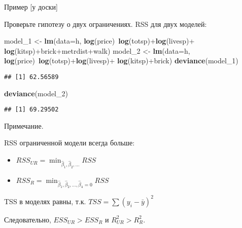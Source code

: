 \documentclass[ignorenonframetext,]{beamer}
\newenvironment{Shaded}{\begin{snugshade}}{\end{snugshade}}
\newcommand{\KeywordTok}[1]{\textcolor[rgb]{0.13,0.29,0.53}{\textbf{{#1}}}}
\newcommand{\DataTypeTok}[1]{\textcolor[rgb]{0.13,0.29,0.53}{{#1}}}
\newcommand{\StringTok}[1]{\textcolor[rgb]{0.31,0.60,0.02}{{#1}}}
\newcommand{\NormalTok}[1]{{#1}}
\begin{document}
\begin{frame}[fragile]{Пример {[}у доски{]}}

Проверьте гипотезу о двух ограничениях. RSS для двух моделей:

\begin{Shaded}
\begin{Highlighting}[]
\NormalTok{model_1 <-}\StringTok{ }\KeywordTok{lm}\NormalTok{(}\DataTypeTok{data=}\NormalTok{h, }\KeywordTok{log}\NormalTok{(price)~}\KeywordTok{log}\NormalTok{(totsp)+}\KeywordTok{log}\NormalTok{(livesp)+}
\StringTok{                }\KeywordTok{log}\NormalTok{(kitsp)+brick+metrdist+walk)}
\NormalTok{model_2 <-}\StringTok{ }\KeywordTok{lm}\NormalTok{(}\DataTypeTok{data=}\NormalTok{h, }\KeywordTok{log}\NormalTok{(price)~}\KeywordTok{log}\NormalTok{(totsp)+}\KeywordTok{log}\NormalTok{(livesp)+}
\StringTok{                }\KeywordTok{log}\NormalTok{(kitsp)+brick)}
\KeywordTok{deviance}\NormalTok{(model_1)}
\end{Highlighting}
\end{Shaded}

\begin{verbatim}
## [1] 62.56589
\end{verbatim}

\begin{Shaded}
\begin{Highlighting}[]
\KeywordTok{deviance}\NormalTok{(model_2)}
\end{Highlighting}
\end{Shaded}

\begin{verbatim}
## [1] 69.29502
\end{verbatim}

\end{frame}

\begin{frame}{Примечание.}

RSS ограниченной модели всегда больше:

\begin{itemize}
\item
  \(RSS_{UR} = \min_{\hat{\beta}_1, \hat{\beta}_2, \ldots} RSS\)
\item
  \(RSS_{R} = \min_{\hat{\beta}_1, \hat{\beta}_2, \ldots, \hat{\beta}_4=0} RSS\)
\end{itemize}

TSS в моделях равны, т.к. \(TSS=\sum ( y_i -\bar{y})^2\)

Следовательно, \(ESS_{UR}>ESS_R\) и \(R^2_{UR}>R^2_R\).

\end{frame}
\end{document}
